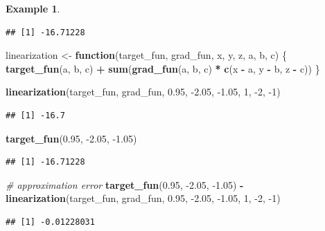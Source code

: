 \documentclass[
]{book}
\newenvironment{Shaded}{\begin{snugshade}}{\end{snugshade}}
\newcommand{\CommentTok}[1]{\textcolor[rgb]{0.56,0.35,0.01}{\textit{#1}}}
\newcommand{\ControlFlowTok}[1]{\textcolor[rgb]{0.13,0.29,0.53}{\textbf{#1}}}
\newcommand{\DecValTok}[1]{\textcolor[rgb]{0.00,0.00,0.81}{#1}}
\newcommand{\FloatTok}[1]{\textcolor[rgb]{0.00,0.00,0.81}{#1}}
\newcommand{\KeywordTok}[1]{\textcolor[rgb]{0.13,0.29,0.53}{\textbf{#1}}}
\newcommand{\NormalTok}[1]{#1}
\newcommand{\OperatorTok}[1]{\textcolor[rgb]{0.81,0.36,0.00}{\textbf{#1}}}
\newcommand{\StringTok}[1]{\textcolor[rgb]{0.31,0.60,0.02}{#1}}
\theoremstyle{definition}
\theoremstyle{definition}
\newtheorem{example}{Example}[chapter]
\theoremstyle{definition}
\theoremstyle{definition}
\theoremstyle{remark}
\begin{document}
\begin{example}
\begin{verbatim}
## [1] -16.71228
\end{verbatim}

\begin{Shaded}
\begin{Highlighting}[]
\NormalTok{linearization <-}\StringTok{ }\ControlFlowTok{function}\NormalTok{(target_fun, grad_fun, x, y, z, a, b, c) \{}
        \KeywordTok{target_fun}\NormalTok{(a, b, c) }\OperatorTok{+}\StringTok{ }\KeywordTok{sum}\NormalTok{(}\KeywordTok{grad_fun}\NormalTok{(a, b, c) }\OperatorTok{*}\StringTok{ }\KeywordTok{c}\NormalTok{(x }\OperatorTok{-}\StringTok{ }\NormalTok{a, y }\OperatorTok{-}\StringTok{ }\NormalTok{b, z }\OperatorTok{-}\StringTok{ }\NormalTok{c))}
\NormalTok{\}}


\KeywordTok{linearization}\NormalTok{(target_fun, grad_fun, }\FloatTok{0.95}\NormalTok{, }\FloatTok{-2.05}\NormalTok{, }\FloatTok{-1.05}\NormalTok{, }\DecValTok{1}\NormalTok{, }\DecValTok{-2}\NormalTok{, }\DecValTok{-1}\NormalTok{)}
\end{Highlighting}
\end{Shaded}

\begin{verbatim}
## [1] -16.7
\end{verbatim}

\begin{Shaded}
\begin{Highlighting}[]
\KeywordTok{target_fun}\NormalTok{(}\FloatTok{0.95}\NormalTok{, }\FloatTok{-2.05}\NormalTok{, }\FloatTok{-1.05}\NormalTok{)}
\end{Highlighting}
\end{Shaded}

\begin{verbatim}
## [1] -16.71228
\end{verbatim}

\begin{Shaded}
\begin{Highlighting}[]
\CommentTok{# approximation error}
\KeywordTok{target_fun}\NormalTok{(}\FloatTok{0.95}\NormalTok{, }\FloatTok{-2.05}\NormalTok{, }\FloatTok{-1.05}\NormalTok{) }\OperatorTok{-}\StringTok{ }\KeywordTok{linearization}\NormalTok{(target_fun, grad_fun, }\FloatTok{0.95}\NormalTok{, }\FloatTok{-2.05}\NormalTok{, }\FloatTok{-1.05}\NormalTok{, }\DecValTok{1}\NormalTok{, }\DecValTok{-2}\NormalTok{, }\DecValTok{-1}\NormalTok{)}
\end{Highlighting}
\end{Shaded}

\begin{verbatim}
## [1] -0.01228031
\end{verbatim}

\end{example}
\end{document}
